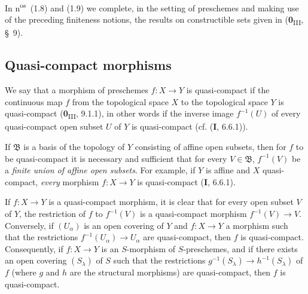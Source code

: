 In n\textsuperscript{os}~(1.8) and (1.9) we complete, in the setting of
preschemes and making use of the preceding finiteness notions, the
results on constructible sets given in
(\textbf{0}\textsubscript{III}, §~9).

\subsection{Quasi-compact morphisms}
\label{subsection:IV.1.1}

\begin{definition}[1.1.1]
\label{IV.1.1.1}
We say that a morphism of preschemes $f:X\to Y$ is quasi-compact if
the continuous map $f$ from the topological space $X$ to the topological
space $Y$ is quasi-compact (\textbf{0}\textsubscript{III}, 9.1.1), in other
words if the inverse image $f^{-1}(U)$ of every quasi-compact open subset $U$
of $Y$ is quasi-compact (cf. (\textbf{I}, 6.6.1)).
\end{definition}

If $\mathfrak B$ is a basis of the topology of $Y$ consisting of affine open
subsets, then for $f$ to be quasi-compact it is necessary and sufficient that
for every $V\in\mathfrak B$, $f^{-1}(V)$ be a \emph{finite union of affine
open subsets}. For example, if $Y$ is affine and $X$ quasi-compact,
\emph{every} morphism $f:X\to Y$ is quasi-compact (\textbf{I}, 6.6.1).

If $f:X\to Y$ is a quasi-compact morphism, it is clear that for every
open subset $V$ of $Y$, the restriction of $f$ to $f^{-1}(V)$ is a
quasi-compact morphism $f^{-1}(V)\to V$. Conversely, if $(U_\alpha)$ is an
open covering of $Y$ and $f:X\to Y$ a morphism such that the restrictions
$f^{-1}(U_\alpha)\to U_\alpha$ are quasi-compact, then $f$ is
quasi-compact. Consequently,
if $f:X\to Y$ is an $S$-morphism of $S$-preschemes, and if there exists
an open covering $(S_\lambda)$ of $S$ such that the restrictions
$g^{-1}(S_\lambda)\to h^{-1}(S_\lambda)$ of $f$ (where $g$ and $h$ are the
structural morphisms) are quasi-compact, then $f$ is quasi-compact.

